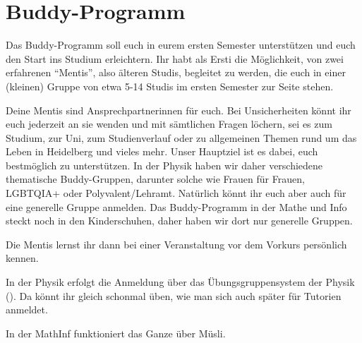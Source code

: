 \section{Buddy-Programm}
\label{buddy}
Das Buddy-Programm soll euch in eurem ersten Semester unterstützen und euch den Start ins Studium erleichtern. Ihr habt als Ersti die Möglichkeit, von zwei erfahrenen ``Mentis'', also älteren Studis, begleitet zu werden, die euch in einer (kleinen) Gruppe von etwa 5-14 Studis im ersten Semester zur Seite stehen.

Deine Mentis sind Ansprechpartnerinnen für euch. Bei Unsicherheiten könnt ihr euch jederzeit an sie wenden und mit sämtlichen Fragen löchern, sei es zum Studium, zur Uni, zum Studienverlauf oder zu allgemeinen Themen rund um das Leben in Heidelberg und vieles mehr. Unser Hauptziel ist es dabei, euch bestmöglich zu unterstützen. In der Physik haben wir daher verschiedene thematische Buddy-Gruppen, darunter solche wie Frauen für Frauen, LGBTQIA+ oder Polyvalent/Lehramt. Natürlich könnt ihr euch aber auch für eine generelle Gruppe anmelden. Das Buddy-Programm in der Mathe und Info steckt noch in den Kinderschuhen, daher haben wir dort nur generelle Gruppen.

Die Mentis lernst ihr dann bei einer Veranstaltung vor dem Vorkurs persönlich kennen.

In der Physik erfolgt die Anmeldung über das Übungsgruppensystem der Physik (). Da könnt ihr gleich schonmal üben, wie man sich auch später für Tutorien anmeldet.

In der MathInf funktioniert das Ganze über Müsli.

